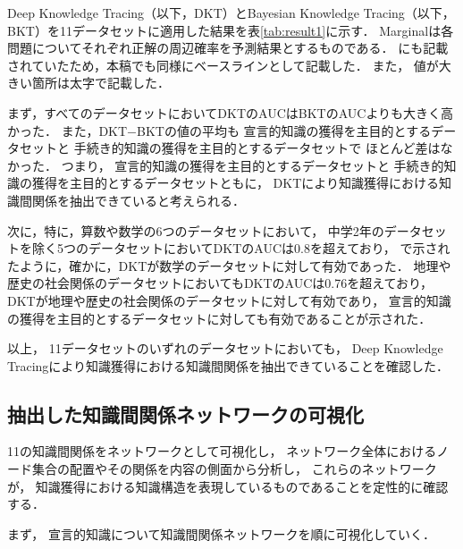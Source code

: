 Deep Knowledge Tracing（以下，DKT）とBayesian Knowledge Tracing（以下，BKT）を11データセットに適用した結果を表\ref{tab:result1}に示す．
Marginalは各問題についてそれぞれ正解の周辺確率を予測結果とするものである．
\cite{piech2015deep}にも記載されていたため，本稿でも同様にベースラインとして記載した．
また，
値が大きい箇所は太字で記載した．

まず，すべてのデータセットにおいてDKTのAUCはBKTのAUCよりも大きく高かった．
また，DKT$-$BKTの値の平均も 
宣言的知識の獲得を主目的とするデータセットと
手続き的知識の獲得を主目的とするデータセットで
ほとんど差はなかった．
つまり，
宣言的知識の獲得を主目的とするデータセットと
手続き的知識の獲得を主目的とするデータセットともに，
DKTにより知識獲得における知識間関係を抽出できていると考えられる．

次に，特に，算数や数学の6つのデータセットにおいて，
中学2年のデータセットを除く5つのデータセットにおいてDKTのAUCは0.8を超えており，
\cite{piech2015deep}で示されたように，確かに，DKTが数学のデータセットに対して有効であった．
地理や歴史の社会関係のデータセットにおいてもDKTのAUCは0.76を超えており，
DKTが地理や歴史の社会関係のデータセットに対して有効であり，
宣言的知識の獲得を主目的とするデータセットに対しても有効であることが示された．


以上，
11データセットのいずれのデータセットにおいても，
Deep Knowledge Tracingにより知識獲得における知識間関係を抽出できていることを確認した．




\subsection{抽出した知識間関係ネットワークの可視化}
11の知識間関係をネットワークとして可視化し，
ネットワーク全体におけるノード集合の配置やその関係を内容の側面から分析し，
これらのネットワークが，
知識獲得における知識構造を表現しているものであることを定性的に確認する．




まず，
宣言的知識について知識間関係ネットワークを順に可視化していく．

